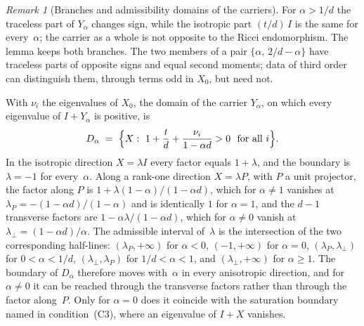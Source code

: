 \documentclass[pdflatex,sn-mathphys-num]{sn-jnl} %
\theoremstyle{remark}
\newtheorem*{remark}{Remark}
\theoremstyle{plain}
\begin{document}
    \begin{remark}[Branches and admissibility domains of the carriers]
      \label{rem:carrier-domains}
      For $\alpha > 1/d$ the traceless part of $Y_\alpha$ changes sign, while the isotropic part $(t/d)\,I$ is the
      same for every~$\alpha$; the carrier as a whole is not opposite to the Ricci endomorphism.
      The lemma keeps both branches.
      The two members of a pair $\{\alpha,\, 2/d - \alpha\}$ have traceless parts of opposite signs and equal second
      moments; data of third order can distinguish them, through terms odd in $X_0$, but need not.

      With $\nu_i$ the eigenvalues of $X_0$, the domain of the carrier $Y_\alpha$, on which every eigenvalue of
      $I + Y_\alpha$ is positive, is
      \begin{equation}\label{eq:carrier-domain}
        D_\alpha
        \;=\;
        \Bigl\{ X :\ 1 + \frac{t}{d} + \frac{\nu_i}{1 - \alpha d} > 0 \ \text{ for all } i \Bigr\}.
      \end{equation}
      In the isotropic direction $X = \lambda I$ every factor equals $1 + \lambda$, and the boundary is
      $\lambda = -1$ for every~$\alpha$.
      Along a rank-one direction $X = \lambda P$, with $P$ a unit projector, the factor along $P$ is
      $1 + \lambda(1-\alpha)/(1-\alpha d)$, which for $\alpha \neq 1$ vanishes at
      $\lambda_{P} = -(1-\alpha d)/(1-\alpha)$ and is identically $1$ for $\alpha = 1$, and the
      $d-1$ transverse factors are $1 - \alpha\lambda/(1-\alpha d)$, which for $\alpha \neq 0$ vanish at
      $\lambda_{\perp} = (1-\alpha d)/\alpha$.
      The admissible interval of~$\lambda$ is the intersection of the two corresponding half-lines:
      $(\lambda_P, +\infty)$ for $\alpha < 0$, $(-1, +\infty)$ for $\alpha = 0$, $(\lambda_P, \lambda_\perp)$ for
      $0 < \alpha < 1/d$, $(\lambda_\perp, \lambda_P)$ for $1/d < \alpha < 1$, and $(\lambda_\perp, +\infty)$ for
      $\alpha \geq 1$.
      The boundary of $D_\alpha$ therefore moves with~$\alpha$ in every anisotropic direction, and for
      $\alpha \neq 0$ it can be reached through the transverse factors rather than through the factor along~$P$.
      Only for $\alpha = 0$ does it coincide with the saturation boundary named in condition~(C3), where an
      eigenvalue of $I + X$ vanishes.
    \end{remark}
\end{document}
